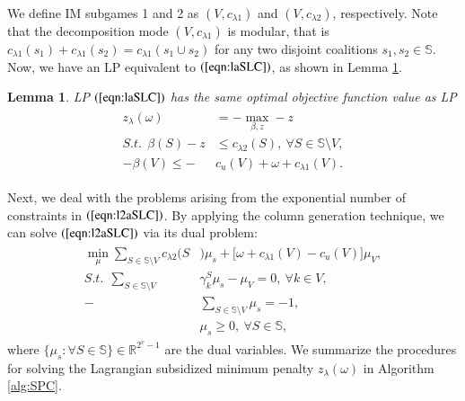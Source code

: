 \documentclass[authoryear,review,12pt]{elsarticle}
\newtheorem{lemma}{Lemma}
\newcommand{\R}{\mathbb{R}}
\begin{document}
We define IM subgames 1 and 2 as $(V,c_{\lambda1})$ and $(V,c_{\lambda2})$, respectively. Note that the decomposition mode $(V,c_{\lambda1})$ is modular, that is $c_{\lambda1}(s_1)+c_{\lambda1}(s_2) = c_{\lambda1}(s_1 \cup s_2)$ for any two disjoint coalitions $s_1, s_2 \in \mathbb{S}$. Now, we have an LP equivalent to $(\ref{eqn:laSLC})$, as shown in Lemma \ref{lemma:equivalentLP}.


\begin{lemma}\label{lemma:equivalentLP}
LP $(\ref{eqn:laSLC})$ has the same optimal objective function value as LP
\begin{eqnarray}\label{eqn:l2aSLC}
\begin{aligned}
z_{\lambda}(\omega) &= -\max_{\beta,z} -z\\
S.t. ~~ \beta(S) - z &\leq  c_{\lambda2}(S),~ \forall S \in \mathbb{S} \setminus V,\\
 -\beta(V) \leq  -&c_u(V) + \omega  + c_{\lambda1}(V).
\end{aligned}
\end{eqnarray}
\end{lemma}


Next, we deal with the problems arising from the exponential number of constraints in $(\ref{eqn:l2aSLC})$.
By applying the column generation technique, we can solve $(\ref{eqn:l2aSLC})$ via its dual problem:
\begin{eqnarray}\label{eqn:master}
\begin{aligned}
\min_{\mu} \sum_{S \in \mathbb{S} \setminus V} c_{\lambda2}(S&)\mu_s + \big[ \omega  + c_{\lambda1}(V) -c_u(V) \big]\mu_V,\\
S.t.~~\sum_{S \in \mathbb{S} \setminus V}& \gamma_k^S \mu_s - \mu_V = 0,~\forall k \in V,\\
-&\sum_{S \in \mathbb{S} \setminus V} \mu_s = -1,\\
&\mu_s \geq 0, ~\forall S \in \mathbb{S},
\end{aligned}
\end{eqnarray}
where $\{ \mu_s:\forall S \in \mathbb{S} \} \in \R^{2^v-1}$ are the dual variables.
We summarize the procedures for solving the Lagrangian subsidized minimum penalty $z_{\lambda}(\omega)$ in Algorithm \ref{alg:SPC}.
\end{document}
